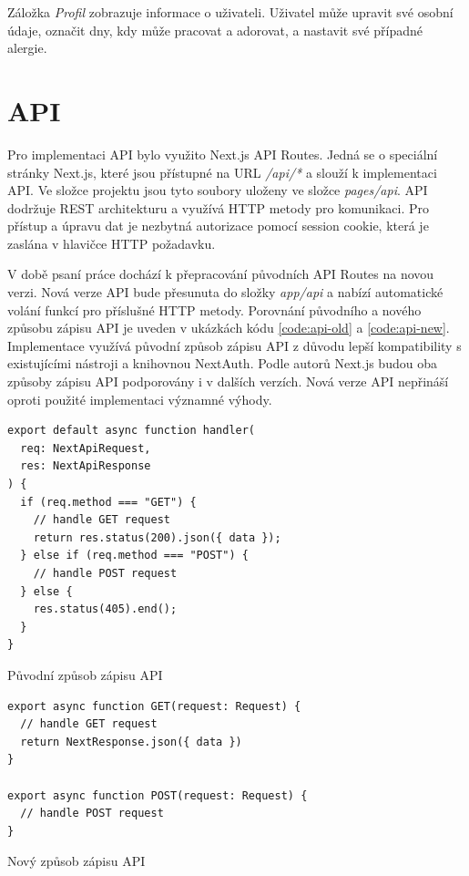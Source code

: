 Záložka \textit{Profil} zobrazuje informace o uživateli. Uživatel může upravit své osobní údaje, označit dny, kdy může pracovat a adorovat,
a nastavit své případné alergie.

\section{API}

Pro implementaci API bylo využito Next.js API Routes. Jedná se o speciální stránky Next.js, které jsou přístupné na URL \textit{/api/*} a slouží k implementaci API.
Ve složce projektu jsou tyto soubory uloženy ve složce \textit{pages/api}.
API dodržuje REST architekturu a využívá HTTP metody pro komunikaci. Pro přístup a úpravu dat je nezbytná autorizace pomocí session cookie, která je zaslána v hlavičce HTTP požadavku.

V době psaní práce dochází k přepracování původních API Routes na novou verzi. Nová verze API bude přesunuta do složky \textit{app/api} a nabízí automatické volání
funkcí pro příslušné HTTP metody. Porovnání původního a nového způsobu zápisu API je uveden v ukázkách kódu \ref{code:api-old} a \ref{code:api-new}.
Implementace využívá původní způsob zápisu API z důvodu lepší kompatibility s existujícími nástroji a knihovnou NextAuth. Podle autorů Next.js budou oba způsoby zápisu API
podporovány i v dalších verzích. Nová verze API nepřináší oproti použité implementaci významné výhody.

\begin{listing}[h]
  \begin{verbatim}
export default async function handler(
  req: NextApiRequest,
  res: NextApiResponse
) {
  if (req.method === "GET") {
    // handle GET request
    return res.status(200).json({ data });
  } else if (req.method === "POST") {
    // handle POST request
  } else {
    res.status(405).end();
  }
}
  \end{verbatim}
  \caption{Původní způsob zápisu API}
  \label{code:api-old}
\end{listing}

\begin{listing}[h]
\begin{verbatim}
export async function GET(request: Request) {
  // handle GET request
  return NextResponse.json({ data })
}

export async function POST(request: Request) {
  // handle POST request
}
  \end{verbatim}
  \caption{Nový způsob zápisu API}
  \label{code:api-new}
\end{listing}

